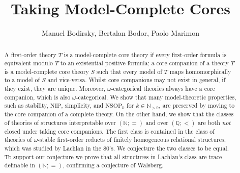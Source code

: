 \documentclass{amsart}
\title{Taking Model-Complete Cores}
\author{Manuel Bodirsky, Bertalan Bodor, Paolo Marimon}
\theoremstyle{definition}
\theoremstyle{remark}
\numberwithin{equation}{section}
\newcommand\red[1]{\textcolor{red}{#1}}
\newcommand\blue[1]{\textcolor{blue}{#1}}
\newcommand\green[1]{\textcolor{green!50!black}{#1}}
\newcommand\ignore[1]{}
\begin{document}
\begin{abstract} 
A first-order theory $T$ is a model-complete core  theory if every first-order formula is equivalent modulo $T$ to an existential positive formula; a
core  companion of a theory $T$ is a model-complete core  theory $S$ such that every model of $T$ maps homomorphically to a model of $S$ and vice-versa. Whilst core  companions may not exist in general, if they exist, they are unique. Moreover, $\omega$-categorical theories always have a core companion, which is also $\omega$-categorical. 
We show that many model-theoretic properties, such as stability, $\mathrm{NIP}$, simplicity, and $\mathrm{NSOP}_k$ for ${k\in\mathbb{N}_{>0}}$, are preserved by moving to the core companion of a complete theory. On the other hand, we show that the classes of theories of structures interpretable 
over $({\mathbb N};=)$ and over $({\mathbb Q};<)$
are both \emph{not} closed under taking core companions. 
The first class is contained in the class of theories of $\omega$-stable first-order reducts of finitely homogeneous relational structures, which was studied by Lachlan in the 80's. We conjecture the two classes to be equal. To support our conjecture we prove that all structures in Lachlan's class are trace definable in $(\mathbb{N}; =)$, confirming a conjecture of Walsberg.
\end{abstract}


\maketitle

\tableofcontents

\ignore{
\section*{Notes}


Colors for changes:
\begin{itemize}
\item \red{red}: Manuel
\item \blue{blue}: Paolo
\item \green{green}: Bertalan
\end{itemize} 
If some colored text is approved by another author, the color can be removed. 
}
\end{document}

